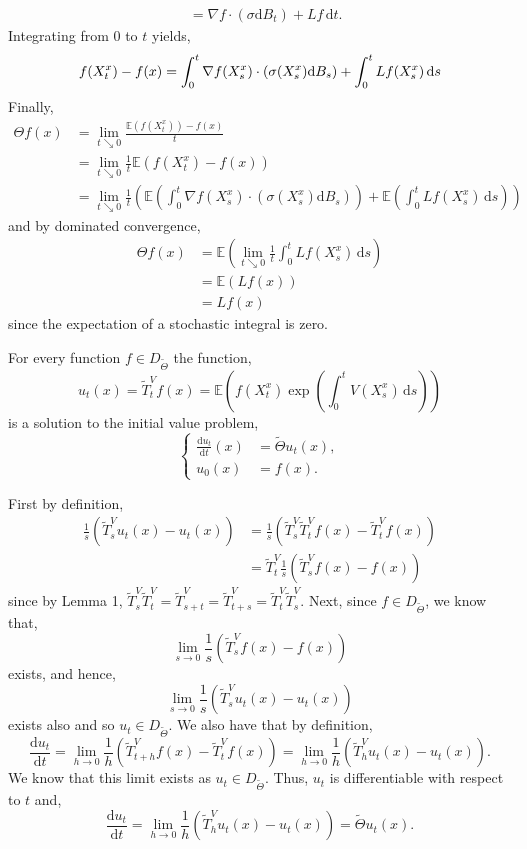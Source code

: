 \documentclass[a4paper,12pt,draft]{report}
\begin{document}
{\begin{align}
& = \nabla f\cdot(\sigma\mathrm{d}B_t) + Lf\,\mathrm{d}t.\nonumber
\end{align}
Integrating from $0$ to $t$ yields,
$$
f(X_t^x) - f(x) = \int_0^t \nabla f(X_s^x)\cdot(\sigma(X_s^x)\mathrm{d}B_s) + \int_0^t Lf(X_s^x)\,\mathrm{d}s\nonumber\\
$$
Finally,
\begin{align}
\Theta f(x) & = \lim_{t \searrow 0}\frac{\mathbb{E}(f(X_t^x)) - f(x)}{t}\nonumber\\
& = \lim_{t \searrow 0}\frac{1}{t}\mathbb{E}(f(X_t^x) - f(x))\nonumber\\
& = \lim_{t \searrow 0}\frac{1}{t}\left(\mathbb{E}\left(\int_0^t \nabla f(X_s^x)\cdot(\sigma(X_s^x)\mathrm{d}B_s)\right) + \mathbb{E}\left(\int_0^t Lf(X_s^x)\,\mathrm{d}s\right)\right)\nonumber
\end{align}
and by dominated convergence,
\begin{align}
\Theta f(x) & = \mathbb{E}\left(\lim_{t \searrow 0}\frac{1}{t}\int_0^t Lf(X_s^x)\,\mathrm{d}s\right)\nonumber\\
& = \mathbb{E}(Lf(x))\nonumber\\
& = Lf(x)\nonumber
\end{align}
since the expectation of a stochastic integral is zero.

\qedhere
}

\lemma
{
For every function $f \in D_{\tilde{\Theta}}$ the function,
$$
u_t(x) = \tilde{T}_t^Vf(x) = \mathbb{E}\left(f(X_t^x)\exp\left(\int_0^t V(X_s^x)\,\mathrm{d}s\right)\right)
$$
is a solution to the initial value problem,
\begin{equation}
\left\{
\begin{aligned}
\frac{\mathrm{d}u_t}{\mathrm{d}t}(x) & = \tilde{\Theta}u_t(x),\\ \label{ACP}
u_0(x) & = f(x).
\end{aligned}
\right.
\end{equation}
}
\proof
{
First by definition,
\begin{align}
\frac{1}{s}(\tilde{T}_s^Vu_t(x) - u_t(x)) & = \frac{1}{s}(\tilde{T}_s^V\tilde{T}_t^Vf(x) - \tilde{T}_t^Vf(x))\nonumber\\
& = \tilde{T}_t^V\frac{1}{s}(\tilde{T}_s^Vf(x) - f(x))\nonumber
\end{align}
since by Lemma 1, $\tilde{T}_s^V\tilde{T}_t^V = \tilde{T}_{s + t}^V = \tilde{T}_{t + s}^V = \tilde{T}_t^V\tilde{T}_s^V$.  Next, since $f \in D_{\tilde{\Theta}}$, we know that,
$$
\lim_{s \to 0}\frac{1}{s}(\tilde{T}_s^Vf(x) - f(x))
$$
exists, and hence,
$$
\lim_{s \to 0}\frac{1}{s}(\tilde{T}_s^Vu_t(x) - u_t(x))
$$
exists also and so $u_t \in D_{\tilde{\Theta}}$.  We also have that by definition,
$$
\frac{\mathrm{d}u_t}{\mathrm{d} t} = \lim_{h \to 0}\frac{1}{h}(\tilde{T}_{t + h}^Vf(x) - \tilde{T}_t^Vf(x)) = \lim_{h \to 0}\frac{1}{h}(\tilde{T}_h^Vu_t(x) - u_t(x)).
$$
We know that this limit exists as $u_t \in D_{\tilde{\Theta}}$.  Thus, $u_t$ is differentiable with respect to $t$ and,
$$
\frac{\mathrm{d}u_t}{\mathrm{d} t} = \lim_{h \to 0}\frac{1}{h}(\tilde{T}_h^Vu_t(x) - u_t(x)) = \tilde{\Theta}u_t(x).
$$

\qedhere
}
\end{document}

